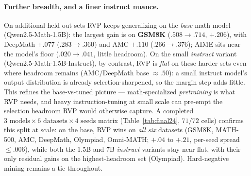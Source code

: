 \paragraph{Further breadth, and a finer instruct nuance.}
On additional held-out sets RVP keeps generalizing on the \emph{base} math model
(Qwen2.5-Math-1.5B): the largest gain is on \textbf{GSM8K} ($.508\!\to\!.714$, $+.206$),
with DeepMath $+.077$ ($.283\!\to\!.360$) and AMC $+.110$ ($.266\!\to\!.376$);
AIME sits near the model's floor ($.020\!\to\!.041$, little headroom). On the small \emph{instruct}
variant (Qwen2.5-Math-1.5B-Instruct), by contrast, RVP is \emph{flat} on these harder sets even
where headroom remains (AMC/DeepMath base $\approx.50$): a small instruct model's output
distribution is already selection-sharpened, so the margin step adds little. This refines the
base-vs-tuned picture --- math-specialized \emph{pretraining} is what RVP needs, and heavy
instruction-tuning at small scale can pre-empt the selection headroom RVP would otherwise capture.
A completed $3\text{ models}\times 6\text{ datasets}\times 4\text{ seeds}$ matrix
(Table~\ref{tab:final24}, $71/72$ cells) confirms this
split at scale: on the base, RVP wins on \emph{all six} datasets (GSM8K, MATH-500, AMC, DeepMath,
Olympiad, Omni-MATH; $+.04$ to $+.21$, per-seed spread ${\le}.006$), while both the 1.5B and 7B
\emph{instruct} variants stay near-flat, with their only residual gains on the highest-headroom set
(Olympiad). Hard-negative mining remains a tie throughout.

